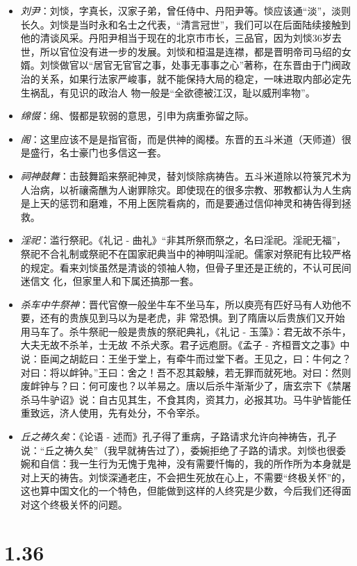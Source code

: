 \documentclass[]{book}
\providecommand{\tightlist}{%
  \setlength{\itemsep}{0pt}\setlength{\parskip}{0pt}}
\begin{document}
\begin{itemize}
\tightlist
\item
  \emph{刘尹}：刘惔，字真长，汉家子弟，曾任侍中、丹阳尹等。惔应该通``淡''，淡则长久。刘惔是当时永和名士之代表，``清言冠世''，我们可以在后面陆续接触到他的清谈风采。丹阳尹相当于现在的北京市市长，三品官，因为刘惔36岁去世，所以官位没有进一步的发展。刘惔和桓温是连襟，都是晋明帝司马绍的女婿。刘惔做官以``居官无官官之事，处事无事事之心''著称，在东晋由于门阀政治的关系，如果行法家严峻事，就不能保持大局的稳定，一味进取内部必定先生祸乱，有见识的政治人
  物一般是``全欲德被江汉，耻以威刑率物''。
\item
  \emph{绵惙}：绵、惙都是软弱的意思，引申为病重弥留之际。
\item
  \emph{阁}：这里应该不是是指官衙，而是供神的阁楼。东晋的五斗米道（天师道）很是盛行，名士豪门也多信这一套。
\item
  \emph{祠神鼓舞}：击鼓舞蹈来祭祀神灵，替刘惔除病祷告。五斗米道除以符箓咒术为人治病，以祈禳斋醮为人谢罪除灾。即使现在的很多宗教、邪教都认为人生病是上天的惩罚和磨难，不用上医院看病的，而是要通过信仰神灵和祷告得到拯救。
\item
  \emph{淫祀}：滥行祭祀。《礼记 -
  曲礼》``非其所祭而祭之，名曰淫祀。淫祀无福''，
  祭祀不合礼制或祭祀不在国家祀典当中的神明叫淫祀。儒家对祭祀有比较严格的规定。看来刘惔虽然是清谈的领袖人物，但骨子里还是正统的，不认可民间迷信文
  化，但家里人和下属还搞那一套。
\item
  \emph{杀车中牛祭神}：晋代官僚一般坐牛车不坐马车，所以庾亮有匹好马有人劝他不要，还有的贵族见到马以为是老虎，非
  常恐惧。到了隋唐以后贵族们又开始用马车了。杀牛祭祀一般是贵族的祭祀典礼，《礼记
  - 玉藻》：君无故不杀牛，大夫无故不杀羊，士无故
  不杀犬豕。君子远庖厨。《孟子 -
  齐桓晋文之事》中说：臣闻之胡龁曰：王坐于堂上，有牵牛而过堂下者。王见之，曰：牛何之？对曰：将以衅钟。''王曰：舍之！吾不忍其觳觫，若无罪而就死地。对曰：然则废衅钟与？曰：何可废也？以羊易之。唐以后杀牛渐渐少了，唐玄宗下《禁屠杀马牛驴诏》说：自古见其生，不食其肉，资其力，必报其功。马牛驴皆能任重致远，济人使用，先有处分，不令宰杀。
\item
  \emph{丘之祷久矣}：《论语 -
  述而》孔子得了重病，子路请求允许向神祷告，孔子说：``丘之祷久矣''（我早就祷告过了），委婉拒绝了子路的请求。刘惔也很委婉和自信：我一生行为无愧于鬼神，没有需要忏悔的，我的所作所为本身就是对上天的祷告。刘惔深通老庄，不会把生死放在心上，不需要``终极关怀''的，这也算中国文化的一个特色，但能做到这样的人终究是少数，今后我们还得面对这个终极关怀的问题。
\end{itemize}

\section{1.36}\label{section-35}
\end{document}
